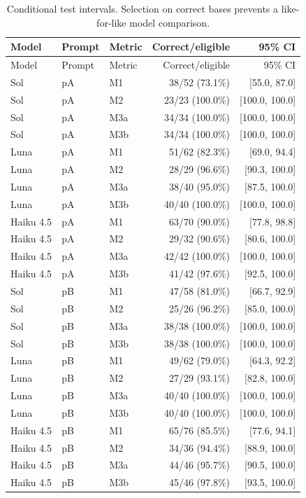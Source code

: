 \documentclass[11pt,a4paper]{article}
\begin{document}
\begingroup\small\setlength{\tabcolsep}{4pt}
\begin{longtable}{lllrr}
\caption{Conditional test intervals. Selection on correct bases prevents a like-for-like model comparison.}\\
\toprule
Model & Prompt & Metric & Correct/eligible & 95\% CI \\
\midrule\endfirsthead
\toprule
Model & Prompt & Metric & Correct/eligible & 95\% CI \\
\midrule\endhead
\bottomrule\endfoot
Sol & pA & M1 & 38/52 (73.1\%) & [55.0, 87.0] \\
Sol & pA & M2 & 23/23 (100.0\%) & [100.0, 100.0] \\
Sol & pA & M3a & 34/34 (100.0\%) & [100.0, 100.0] \\
Sol & pA & M3b & 34/34 (100.0\%) & [100.0, 100.0] \\
Luna & pA & M1 & 51/62 (82.3\%) & [69.0, 94.4] \\
Luna & pA & M2 & 28/29 (96.6\%) & [90.3, 100.0] \\
Luna & pA & M3a & 38/40 (95.0\%) & [87.5, 100.0] \\
Luna & pA & M3b & 40/40 (100.0\%) & [100.0, 100.0] \\
Haiku 4.5 & pA & M1 & 63/70 (90.0\%) & [77.8, 98.8] \\
Haiku 4.5 & pA & M2 & 29/32 (90.6\%) & [80.6, 100.0] \\
Haiku 4.5 & pA & M3a & 42/42 (100.0\%) & [100.0, 100.0] \\
Haiku 4.5 & pA & M3b & 41/42 (97.6\%) & [92.5, 100.0] \\
Sol & pB & M1 & 47/58 (81.0\%) & [66.7, 92.9] \\
Sol & pB & M2 & 25/26 (96.2\%) & [85.0, 100.0] \\
Sol & pB & M3a & 38/38 (100.0\%) & [100.0, 100.0] \\
Sol & pB & M3b & 38/38 (100.0\%) & [100.0, 100.0] \\
Luna & pB & M1 & 49/62 (79.0\%) & [64.3, 92.2] \\
Luna & pB & M2 & 27/29 (93.1\%) & [82.8, 100.0] \\
Luna & pB & M3a & 40/40 (100.0\%) & [100.0, 100.0] \\
Luna & pB & M3b & 40/40 (100.0\%) & [100.0, 100.0] \\
Haiku 4.5 & pB & M1 & 65/76 (85.5\%) & [77.6, 94.1] \\
Haiku 4.5 & pB & M2 & 34/36 (94.4\%) & [88.9, 100.0] \\
Haiku 4.5 & pB & M3a & 44/46 (95.7\%) & [90.5, 100.0] \\
Haiku 4.5 & pB & M3b & 45/46 (97.8\%) & [93.5, 100.0] \\
\end{longtable}\endgroup
\end{document}
